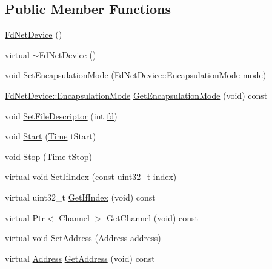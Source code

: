 \subsection*{Public Member Functions}
\begin{DoxyCompactItemize}
\item 
\hyperlink{classns3_1_1FdNetDevice_a81fa1519bf5abcb59cf902d74e264b53}{Fd\+Net\+Device} ()
\item 
virtual \hyperlink{classns3_1_1FdNetDevice_a31f4418c13aa2c2cf259e14155cd7455}{$\sim$\+Fd\+Net\+Device} ()
\item 
void \hyperlink{classns3_1_1FdNetDevice_a93861c71ec179c621b192ec0f864cff4}{Set\+Encapsulation\+Mode} (\hyperlink{classns3_1_1FdNetDevice_abdacbf10c181f50998a98e7688016618}{Fd\+Net\+Device\+::\+Encapsulation\+Mode} mode)
\item 
\hyperlink{classns3_1_1FdNetDevice_abdacbf10c181f50998a98e7688016618}{Fd\+Net\+Device\+::\+Encapsulation\+Mode} \hyperlink{classns3_1_1FdNetDevice_a4e67f8fec1545413979550017ed77cd9}{Get\+Encapsulation\+Mode} (void) const 
\item 
void \hyperlink{classns3_1_1FdNetDevice_ac72fff1b3d44824245645a9bcb37c709}{Set\+File\+Descriptor} (int \hyperlink{mmwave_2model_2fading-traces_2fading__trace__generator_8m_a44f21d5190b5a6df8089f54799628d7e}{fd})
\item 
void \hyperlink{classns3_1_1FdNetDevice_a32bda505142d81a4092048bf200ee6fc}{Start} (\hyperlink{classns3_1_1Time}{Time} t\+Start)
\item 
void \hyperlink{classns3_1_1FdNetDevice_a6849d18a8f1ed78077207057dce6c7ca}{Stop} (\hyperlink{classns3_1_1Time}{Time} t\+Stop)
\item 
virtual void \hyperlink{classns3_1_1FdNetDevice_a7e94668589f3e9778d536da9788fa119}{Set\+If\+Index} (const uint32\+\_\+t index)
\item 
virtual uint32\+\_\+t \hyperlink{classns3_1_1FdNetDevice_a13b410431720411883b779ca542211b7}{Get\+If\+Index} (void) const 
\item 
virtual \hyperlink{classns3_1_1Ptr}{Ptr}$<$ \hyperlink{classns3_1_1Channel}{Channel} $>$ \hyperlink{classns3_1_1FdNetDevice_ada5131b8b2434b720867a0ab28433dd0}{Get\+Channel} (void) const 
\item 
virtual void \hyperlink{classns3_1_1FdNetDevice_a7fd0f69ac39428a18e354ffe21d15d6c}{Set\+Address} (\hyperlink{classns3_1_1Address}{Address} address)
\item 
virtual \hyperlink{classns3_1_1Address}{Address} \hyperlink{classns3_1_1FdNetDevice_a390033e5a444a1a13b8c5d860a3fd85a}{Get\+Address} (void) const 

\end{DoxyCompactItemize}
